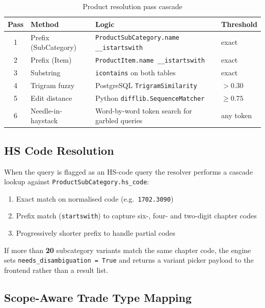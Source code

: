\documentclass[12pt,a4paper]{article}
\begin{document}
\begin{table}[H]
\centering
\renewcommand{\arraystretch}{1.4}
\begin{tabularx}{\textwidth}{clXl}
\toprule
\rowcolor{tableheader!20}
\textbf{Pass} & \textbf{Method} & \textbf{Logic} & \textbf{Threshold} \\
\midrule
1 & Prefix (SubCategory)  & \texttt{ProductSubCategory.name \_\_istartswith} & exact \\
2 & Prefix (Item)         & \texttt{ProductItem.name \_\_istartswith} & exact \\
3 & Substring             & \texttt{icontains} on both tables & exact \\
4 & Trigram fuzzy         & PostgreSQL \texttt{TrigramSimilarity} & $> 0.30$ \\
5 & Edit distance         & Python \texttt{difflib.SequenceMatcher} & $\geq 0.75$ \\
6 & Needle-in-haystack    & Word-by-word token search for garbled queries & any token \\
\bottomrule
\end{tabularx}
\caption{Product resolution pass cascade}
\end{table}

\subsection{HS Code Resolution}

When the query is flagged as an HS-code query the resolver performs a cascade lookup
against \texttt{ProductSubCategory.hs\_code}:

\begin{enumerate}
  \item Exact match on normalised code (e.g.\ \texttt{1702.3090})
  \item Prefix match (\texttt{startswith}) to capture six-, four- and two-digit chapter
        codes
  \item Progressively shorter prefix to handle partial codes
\end{enumerate}

If more than \textbf{20} subcategory variants match the same chapter code, the engine
sets \texttt{needs\_disambiguation = True} and returns a variant picker payload to the
frontend rather than a result list.

\subsection{Scope-Aware Trade Type Mapping}
\end{document}
